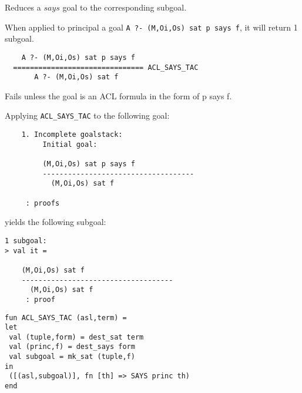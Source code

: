 \SYNOPSIS
Reduces a $says$ goal to the corresponding subgoal.

\DESCRIBE When applied to principal a goal \texttt{A ?- (M,Oi,Os) sat p says f}, it will return 1 subgoal.
\begin{verbatim}
    A ?- (M,Oi,Os) sat p says f
  =============================== ACL_SAYS_TAC
       A ?- (M,Oi,Os) sat f
\end{verbatim}

\FAILURE 
Fails unless the goal is an ACL formula in the form of p says f.

\EXAMPLE
Applying \texttt{ACL\_SAYS\_TAC} to the following goal:
\begin{holboxed}
\begin{verbatim}
    1. Incomplete goalstack:
         Initial goal:
    
         (M,Oi,Os) sat p says f
         ------------------------------------
           (M,Oi,Os) sat f
    
     : proofs
\end{verbatim}
\end{holboxed}
yields the following subgoal:
\begin{holboxed}
\begin{verbatim}
1 subgoal:
> val it =
    
    (M,Oi,Os) sat f
    ------------------------------------
      (M,Oi,Os) sat f
     : proof
\end{verbatim}
\end{holboxed}

\IMPLEMENTATION
\begin{holboxed}
\begin{verbatim}
fun ACL_SAYS_TAC (asl,term) =
let
 val (tuple,form) = dest_sat term
 val (princ,f) = dest_says form
 val subgoal = mk_sat (tuple,f)
in
 ([(asl,subgoal)], fn [th] => SAYS princ th)
end
\end{verbatim}
\end{holboxed}

\SEEALSO
\ENDDOC

